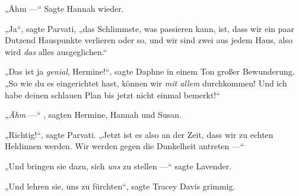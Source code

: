 „Ähm —“ Sagte Hannah wieder.

„Ja“, sagte Parvati, „das Schlimmste, was passieren kann, ist, dass wir ein paar Dutzend Hauspunkte verlieren oder so, und wir sind zwei aus jedem Haus, also wird \emph{das} alles ausgeglichen.“

„Das ist ja \emph{genial}, Hermine!“, sagte Daphne in einem Ton großer Bewunderung.
„So wie du es eingerichtet hast, können wir \emph{mit allem} durchkommen! Und ich habe deinen schlauen Plan bis jetzt nicht einmal bemerkt!“

„\emph{Ähm} —“ , sagten Hermine, Hannah und Susan.

„Richtig!“, sagte Parvati.
„Jetzt ist es also an der Zeit, dass wir zu echten Heldinnen werden. Wir werden gegen die Dunkelheit antreten —“

„Und bringen sie dazu, sich \emph{uns} zu stellen —“ sagte Lavender.

„Und lehren sie, uns zu fürchten“, sagte Tracey Davis grimmig.

